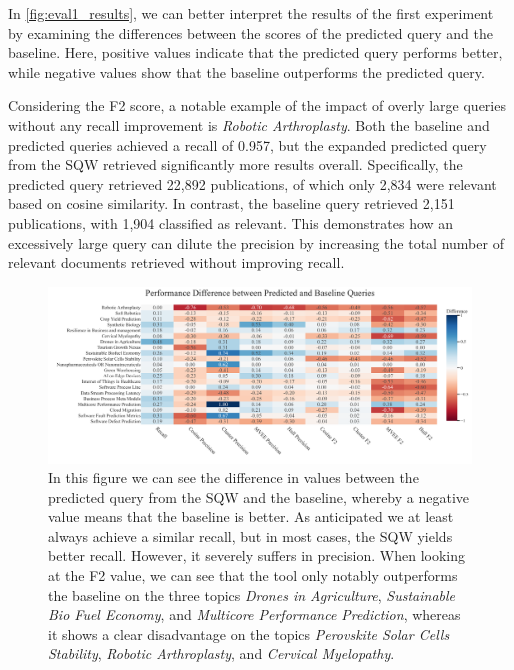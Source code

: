 In \autoref{fig:eval1_results}, we can better interpret the results of the first experiment by examining the differences between the scores of the predicted query and the baseline. Here, positive values indicate that the predicted query performs better, while negative values show that the baseline outperforms the predicted query. 

Considering the F2 score, a notable example of the impact of overly large queries without any recall improvement is \textit{Robotic Arthroplasty}. Both the baseline and predicted queries achieved a recall of 0.957, but the expanded predicted query from the SQW retrieved significantly more results overall. Specifically, the predicted query retrieved 22,892 publications, of which only 2,834 were relevant based on cosine similarity. In contrast, the baseline query retrieved 2,151 publications, with 1,904 classified as relevant. This demonstrates how an excessively large query can dilute the precision by increasing the total number of relevant documents retrieved without improving recall.

\begin{figure}[!t]
	\hspace*{-.8cm}	
	\includegraphics[scale=0.45]{pics/eval1_results.pdf}
	\caption[Evaluation Difference: Experiment 1]{In this figure we can see the difference in values between the predicted query from the SQW and the baseline, whereby a negative value means that the baseline is better. As anticipated we at least always achieve a similar recall, but in most cases, the SQW yields better recall. However, it severely suffers in precision. When looking at the F2 value, we can see that the tool only notably outperforms the baseline on the three topics \textit{Drones in Agriculture}, \textit{Sustainable Bio Fuel Economy}, and \textit{Multicore Performance Prediction}, whereas it shows a clear disadvantage on the topics \textit{Perovskite Solar Cells Stability}, \textit{Robotic Arthroplasty}, and \textit{Cervical Myelopathy}.}
	\label{fig:eval1_results}
\end{figure}

